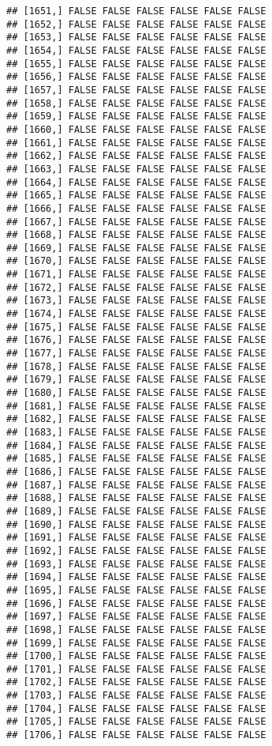 \documentclass[
]{article}
\begin{document}
\begin{verbatim}
## [1651,] FALSE FALSE FALSE FALSE FALSE FALSE
## [1652,] FALSE FALSE FALSE FALSE FALSE FALSE
## [1653,] FALSE FALSE FALSE FALSE FALSE FALSE
## [1654,] FALSE FALSE FALSE FALSE FALSE FALSE
## [1655,] FALSE FALSE FALSE FALSE FALSE FALSE
## [1656,] FALSE FALSE FALSE FALSE FALSE FALSE
## [1657,] FALSE FALSE FALSE FALSE FALSE FALSE
## [1658,] FALSE FALSE FALSE FALSE FALSE FALSE
## [1659,] FALSE FALSE FALSE FALSE FALSE FALSE
## [1660,] FALSE FALSE FALSE FALSE FALSE FALSE
## [1661,] FALSE FALSE FALSE FALSE FALSE FALSE
## [1662,] FALSE FALSE FALSE FALSE FALSE FALSE
## [1663,] FALSE FALSE FALSE FALSE FALSE FALSE
## [1664,] FALSE FALSE FALSE FALSE FALSE FALSE
## [1665,] FALSE FALSE FALSE FALSE FALSE FALSE
## [1666,] FALSE FALSE FALSE FALSE FALSE FALSE
## [1667,] FALSE FALSE FALSE FALSE FALSE FALSE
## [1668,] FALSE FALSE FALSE FALSE FALSE FALSE
## [1669,] FALSE FALSE FALSE FALSE FALSE FALSE
## [1670,] FALSE FALSE FALSE FALSE FALSE FALSE
## [1671,] FALSE FALSE FALSE FALSE FALSE FALSE
## [1672,] FALSE FALSE FALSE FALSE FALSE FALSE
## [1673,] FALSE FALSE FALSE FALSE FALSE FALSE
## [1674,] FALSE FALSE FALSE FALSE FALSE FALSE
## [1675,] FALSE FALSE FALSE FALSE FALSE FALSE
## [1676,] FALSE FALSE FALSE FALSE FALSE FALSE
## [1677,] FALSE FALSE FALSE FALSE FALSE FALSE
## [1678,] FALSE FALSE FALSE FALSE FALSE FALSE
## [1679,] FALSE FALSE FALSE FALSE FALSE FALSE
## [1680,] FALSE FALSE FALSE FALSE FALSE FALSE
## [1681,] FALSE FALSE FALSE FALSE FALSE FALSE
## [1682,] FALSE FALSE FALSE FALSE FALSE FALSE
## [1683,] FALSE FALSE FALSE FALSE FALSE FALSE
## [1684,] FALSE FALSE FALSE FALSE FALSE FALSE
## [1685,] FALSE FALSE FALSE FALSE FALSE FALSE
## [1686,] FALSE FALSE FALSE FALSE FALSE FALSE
## [1687,] FALSE FALSE FALSE FALSE FALSE FALSE
## [1688,] FALSE FALSE FALSE FALSE FALSE FALSE
## [1689,] FALSE FALSE FALSE FALSE FALSE FALSE
## [1690,] FALSE FALSE FALSE FALSE FALSE FALSE
## [1691,] FALSE FALSE FALSE FALSE FALSE FALSE
## [1692,] FALSE FALSE FALSE FALSE FALSE FALSE
## [1693,] FALSE FALSE FALSE FALSE FALSE FALSE
## [1694,] FALSE FALSE FALSE FALSE FALSE FALSE
## [1695,] FALSE FALSE FALSE FALSE FALSE FALSE
## [1696,] FALSE FALSE FALSE FALSE FALSE FALSE
## [1697,] FALSE FALSE FALSE FALSE FALSE FALSE
## [1698,] FALSE FALSE FALSE FALSE FALSE FALSE
## [1699,] FALSE FALSE FALSE FALSE FALSE FALSE
## [1700,] FALSE FALSE FALSE FALSE FALSE FALSE
## [1701,] FALSE FALSE FALSE FALSE FALSE FALSE
## [1702,] FALSE FALSE FALSE FALSE FALSE FALSE
## [1703,] FALSE FALSE FALSE FALSE FALSE FALSE
## [1704,] FALSE FALSE FALSE FALSE FALSE FALSE
## [1705,] FALSE FALSE FALSE FALSE FALSE FALSE
## [1706,] FALSE FALSE FALSE FALSE FALSE FALSE

\end{verbatim}
\end{document}
